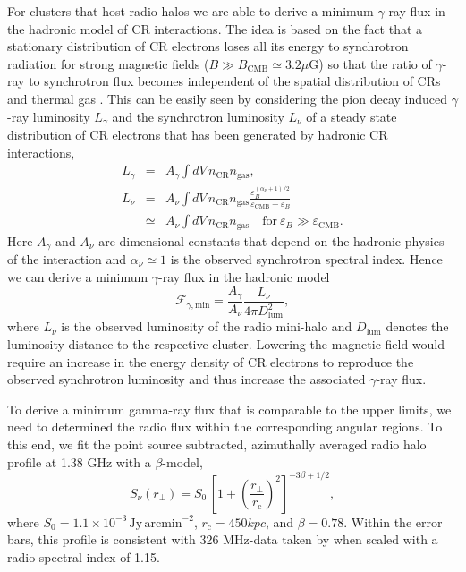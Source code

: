 \documentclass[12pt,manuscript]{aastex}
\newcommand{\rmn}{\mathrm}
\newcommand{\CR}{\mathrm{CR}}
\newcommand{\dps}{\displaystyle}
\newcommand{\eps}{\varepsilon}
\begin{document}
For clusters that host radio halos we are able to derive a minimum $\gamma$-ray
flux in the hadronic model of CR interactions. The idea is based on the fact
that a stationary distribution of CR electrons loses all its energy to
synchrotron radiation for strong magnetic fields ($B \gg B_\rmn{CMB} \simeq 3.2
\mu$G) so that the ratio of $\gamma$-ray to synchrotron flux becomes independent
of the spatial distribution of CRs and thermal gas \citep{2008MNRAS.385.1242P}.
This can be easily seen by considering the pion decay induced $\gamma$-ray
luminosity $L_\gamma$ and the synchrotron luminosity $L_\nu$ of a steady state
distribution of CR electrons that has been generated by hadronic CR
interactions,
\begin{eqnarray}
L_\gamma &=& A_\gamma \dps\int d V\, n_\CR n_\rmn{gas},\\
\label{eq:Lnu}
   L_\nu &=& A_\nu \dps\int d V\, n_\CR n_\rmn{gas} \frac{\dps
    \eps_B^{(\alpha_\nu+1)/2}}{\dps\eps_\rmn{CMB}+\eps_B}\\
  &\simeq&A_\nu \dps\int d V\, n_\CR n_\rmn{gas}\quad\rmn{for}~\eps_B \gg \eps_\rmn{CMB}.
\end{eqnarray}
Here $A_\gamma$ and $A_\nu$ are dimensional constants that depend on the
hadronic physics of the interaction \citep{2008MNRAS.385.1211P,
  2008MNRAS.385.1242P} and $\alpha_\nu\simeq 1$ is the observed synchrotron
spectral index. Hence we can derive a minimum $\gamma$-ray flux in the hadronic
model
\begin{equation}
  \label{eq:Fmin}
  \mathcal{F}_{\gamma,\rmn{min}} = 
  \frac{\dps A_\gamma}{\dps A_\nu}\frac{\dps L_\nu}{\dps 4\pi D_\rmn{lum}^2},
\end{equation}
where $L_\nu$ is the observed luminosity of the radio mini-halo and
$D_\rmn{lum}$ denotes the luminosity distance to the respective cluster.
Lowering the magnetic field would require an increase in the energy density of
CR electrons to reproduce the observed synchrotron luminosity and thus increase
the associated $\gamma$-ray flux. 

To derive a minimum gamma-ray flux that is comparable to the upper limits, we
need to determined the radio flux within the corresponding angular regions. To
this end, we fit the point source subtracted, azimuthally averaged radio halo
profile at 1.38 GHz \citet{1997A&A...321...55D} with a $\beta$-model,
\begin{equation}
S_\nu (r_\bot)= S_0\, 
\left[ 1 + \left( \frac{r_\bot}{r_{\rmn{c}}}\right)^2\right]
^{-3\beta + 1/2},
\label{beta}
\end{equation}
where $S_0 = 1.1 \times 10^{-3}\,\rmn{Jy\,arcmin}^{-2}$, $r_{\rmn{c}} = 450
kpc$, and $\beta = 0.78$.  Within the error bars, this profile is consistent
with 326 MHz-data taken by \citet{2001A&A...369..441G} when scaled with a radio
spectral index of 1.15. 
\end{document}

